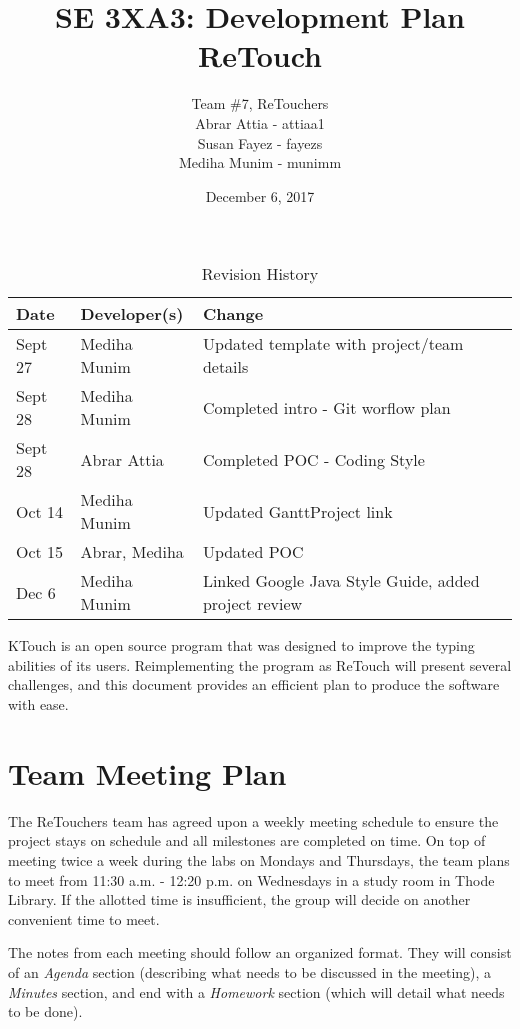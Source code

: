 \documentclass{article}
\title{SE 3XA3: Development Plan\\ReTouch}
\author{Team \#7, ReTouchers
		\\ Abrar Attia - attiaa1
		\\ Susan Fayez - fayezs
		\\ Mediha Munim - munimm
}
\date{December 6, 2017}
\begin{document}
\begin{table}[hp]
\caption{Revision History} \label{TblRevisionHistory}
\begin{tabularx}{\textwidth}{llX}
\toprule
\textbf{Date} & \textbf{Developer(s)} & \textbf{Change}\\
\midrule
Sept 27 & Mediha Munim & Updated template with project/team details\\
Sept 28 & Mediha Munim & Completed intro - Git worflow plan\\
Sept 28 & Abrar Attia & Completed POC - Coding Style\\
Oct 14 & Mediha Munim & Updated GanttProject link\\
Oct 15 & Abrar, Mediha & Updated POC\\
Dec 6 & Mediha Munim & Linked Google Java Style Guide, added project review\\
\bottomrule
\end{tabularx}
\end{table}

\newpage

\maketitle

KTouch is an open source program that was designed to improve the typing abilities of its users. Reimplementing the program as ReTouch will present several challenges, and this document provides an efficient plan to produce the software with ease.

\section{Team Meeting Plan}

	The ReTouchers team has agreed upon a weekly meeting schedule to ensure the project stays on schedule and all milestones are completed on time. On top of meeting twice a week during the labs on Mondays and Thursdays, the team plans to meet from 11:30 a.m. - 12:20 p.m. on Wednesdays in a study room in Thode Library. If the allotted time is insufficient, the group will decide on another convenient time to meet. 

    The notes from each meeting should follow an organized format. They will consist of an \textit{Agenda} section (describing what needs to be discussed in the meeting), a \textit{Minutes} section, and end with a \textit{Homework} section (which will detail what needs to be done).
\end{document}
